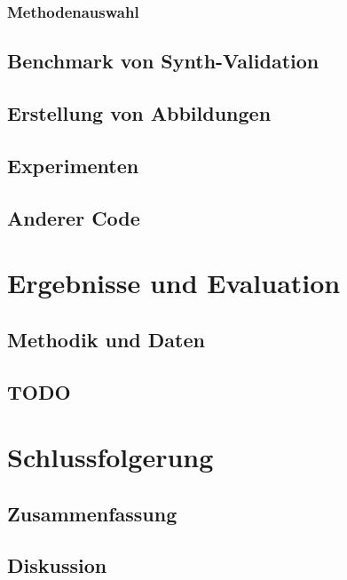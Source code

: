 \documentclass[12pt,a4paper,twoside]{scrartcl}
\numberwithin{equation}{section}
\newcounter{mypagecount}%
\newenvironment{interlude}{%
  \clearpage
  \setcounter{mypagecount}{\value{page}}%
  \thispagestyle{empty}%
  \pagestyle{empty}%
}{%
  \clearpage
  \setcounter{page}{\value{mypagecount}}%
}
\begin{document}
  		\subsubsection{Methodenauswahl}\label{subsubsec:methodenauswahl}
  	\subsection{Benchmark von Synth-Validation}\label{subsec:benchmarkSynthValidation}
  	\subsection{Erstellung von Abbildungen}\label{subsec:erstellungAbbildungen}
  	\subsection{Experimenten}\label{subsec:experimenten}
  	\subsection{Anderer Code}\label{subsec:andererCode}
\clearpage

\section{Ergebnisse und Evaluation}\label{sec:ergebnisseEvaluation}
  	\subsection{Methodik und Daten}\label{subsec:methodikDaten}
  	\subsection{TODO}\label{subsec:todo} %
\clearpage

\section{Schlussfolgerung}\label{sec:schlussfolgerung}
  	\subsection{Zusammenfassung}\label{subsec:zusammenfassung}
  	\subsection{Diskussion}\label{subsec:diskussion}
\clearpage
	

\begin{interlude}
  
  \begin{appendices}
   
  \end{appendices}
  \clearpage
  
  
\end{interlude}
\end{document}
